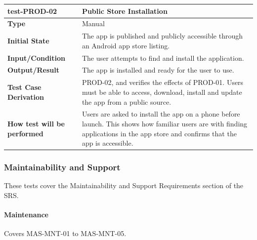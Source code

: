 \documentclass[12pt, titlepage]{article}
\begin{document}
\vspace{1em}

\noindent\begin{tabularx}{\textwidth}{>{\raggedright\arraybackslash}p{3.5cm}X}
  \toprule
  \textbf{test-PROD-02} & \textbf{Public Store Installation}\\
  \midrule
  \textbf{Type} & Manual\\
  \textbf{Initial State} & The app is published and publicly accessible through an Android app store listing.\\
  \textbf{Input/Condition} & The user attempts to find and install the application.\\
  \textbf{Output/Result} & The app is installed and ready for the user to use.\\
  \textbf{Test Case Derivation} & PROD-02, and verifies the effects of PROD-01. Users must be able to access, download, install and update the app from a public source.\\
  \textbf{How test will be performed} & Users are asked to install the app on a phone before launch. This shows how familiar users are with finding applications in the app store and confirms that the app is accessible.\\
  \bottomrule
\end{tabularx}

\subsubsection{Maintainability and Support}

These tests cover the Maintainability and Support Requirements section of the SRS.

\paragraph{Maintenance}

Covers MAS-MNT-01 to MAS-MNT-05.
\end{document}
